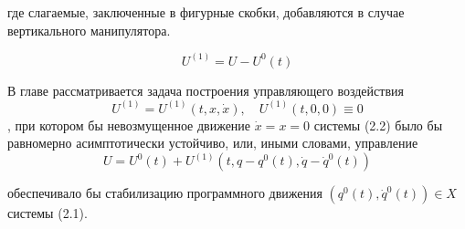 где слагаемые, заключенные в фигурные скобки, добавляются в случае вертикального манипулятора.

$$ U^{(1)} = U - U^{0}(t) $$

В главе рассматривается задача построения управляющего воздействия $$ U^{(1)} = U^{(1)}(t, x, \dot x), \quad U^{(1)} (t, 0, 0) \equiv 0 $$, при котором бы невозмущенное движение $\dot x = x = 0$  системы (2.2) было бы равномерно асимптотически устойчиво, или, иными словами, управление $$U = U^0(t) + U^{(1)}(t, q-q^0(t), \dot q - \dot q^0(t))$$

обеспечивало бы стабилизацию программного движения $(q^0(t), \dot q^0(t)) \in X$  системы (2.1).